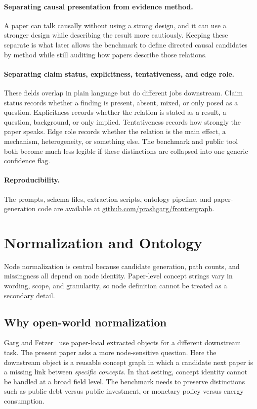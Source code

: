 \documentclass[11pt]{article}
\newcommand{\repoURL}{\href{https://github.com/prashgarg/frontiergraph}{github.com/prashgarg/frontiergraph}}
\begin{document}
\paragraph{Separating causal presentation from evidence method.} A paper can talk causally without using a strong design, and it can use a stronger design while describing the result more cautiously. Keeping these separate is what later allows the benchmark to define directed causal candidates by method while still auditing how papers describe those relations.

\paragraph{Separating claim status, explicitness, tentativeness, and edge role.} These fields overlap in plain language but do different jobs downstream. Claim status records whether a finding is present, absent, mixed, or only posed as a question. Explicitness records whether the relation is stated as a result, a question, background, or only implied. Tentativeness records how strongly the paper speaks. Edge role records whether the relation is the main effect, a mechanism, heterogeneity, or something else. The benchmark and public tool both become much less legible if these distinctions are collapsed into one generic confidence flag.

\paragraph{Reproducibility.} The prompts, schema files, extraction scripts, ontology pipeline, and paper-generation code are available at \repoURL.

\section{Normalization and Ontology}
\label{app:node-normalization}

Node normalization is central because candidate generation, path counts, and missingness all
depend on node identity. Paper-level concept strings vary in wording, scope, and
granularity, so node definition cannot be treated as a secondary detail.

\subsection{Why open-world normalization}

Garg and Fetzer~\citeyearpar{gargfetzer2025causal} use paper-local extracted objects for a
different downstream task. The present paper asks a more node-sensitive question. Here the
downstream object is a reusable concept graph in which a candidate next paper is a missing
link between \emph{specific concepts}. In that setting, concept identity cannot be handled
at a broad field level. The benchmark needs to preserve distinctions such as public debt
versus public investment, or monetary policy versus energy consumption.
\end{document}
